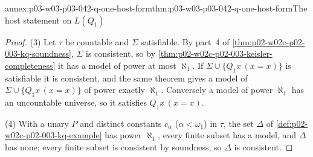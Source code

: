 \begin{annexitem}{annex:p03-w03-p03-042-q-one-host-form}{thm:p03-w03-p03-042-q-one-host-form}{The host statement on \(L(Q_1)\)}
\begin{proof}
(3) Let \(\tau\) be countable and \(\Sigma\) satisfiable.  By part~4 of
\cref{thm:p02-w02c-p02-003-kq-soundness}, \(\Sigma\) is consistent, so by
\cref{thm:p02-w02c-p02-003-keisler-completeness} it has a model of power
at most \(\aleph_1\).  If \(\Sigma\cup\{Q_1x\,(x=x)\}\) is satisfiable it is
consistent, and the same theorem gives a model of \(\Sigma\cup
\{Q_1x\,(x=x)\}\) of power exactly \(\aleph_1\).  Conversely a model of
power \(\aleph_1\) has an uncountable universe, so it satisfies
\(Q_1x\,(x=x)\).

(4) With a unary \(P\) and distinct constants \(c_\alpha\)
(\(\alpha<\omega_1\)) in \(\tau\), the set \(\Delta\) of
\cref{def:p02-w02c-p02-003-kq-example} has power \(\aleph_1\), every finite
subset has a model, and \(\Delta\) has none; every finite subset is
consistent by soundness, so \(\Delta\) is consistent.
\end{proof}
\end{annexitem}


